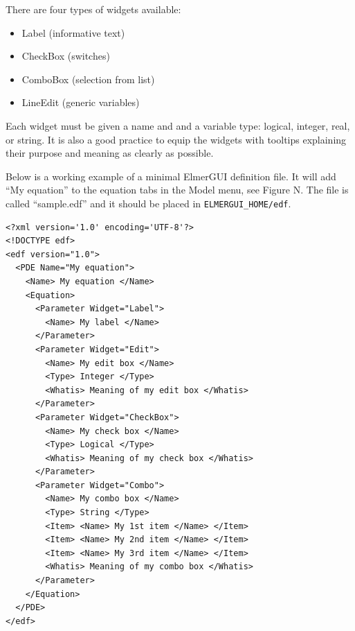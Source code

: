 \documentclass[a4paper,12pt]{article}
\begin{document}
There are four types of widgets available:
\begin{itemize}
 \item Label (informative text)
 \item CheckBox (switches)
 \item ComboBox (selection from list)
 \item LineEdit (generic variables)
\end{itemize}
Each widget must be given a name and and a variable type: logical, integer, real, or  string. It is also a good practice to equip the widgets with tooltips explaining their purpose and meaning as clearly as possible.

Below is a working example of a minimal ElmerGUI definition file. It will add ``My equation'' to the equation tabs in the Model menu, see Figure N. The file is called ``sample.edf'' and it should be placed in {\tt ELMERGUI\_HOME/edf}.

\begin{footnotesize}
\begin{verbatim}
<?xml version='1.0' encoding='UTF-8'?>
<!DOCTYPE edf>
<edf version="1.0">
  <PDE Name="My equation">
    <Name> My equation </Name>
    <Equation>
      <Parameter Widget="Label">
        <Name> My label </Name>
      </Parameter>
      <Parameter Widget="Edit">
        <Name> My edit box </Name>
        <Type> Integer </Type>
        <Whatis> Meaning of my edit box </Whatis>
      </Parameter>
      <Parameter Widget="CheckBox">
        <Name> My check box </Name>
        <Type> Logical </Type>
        <Whatis> Meaning of my check box </Whatis>	  
      </Parameter>
      <Parameter Widget="Combo">
        <Name> My combo box </Name>
        <Type> String </Type>
        <Item> <Name> My 1st item </Name> </Item>
        <Item> <Name> My 2nd item </Name> </Item>
        <Item> <Name> My 3rd item </Name> </Item>
        <Whatis> Meaning of my combo box </Whatis>	  
      </Parameter>
    </Equation>
  </PDE>
</edf>
\end{verbatim}
\end{footnotesize}
\end{document}
